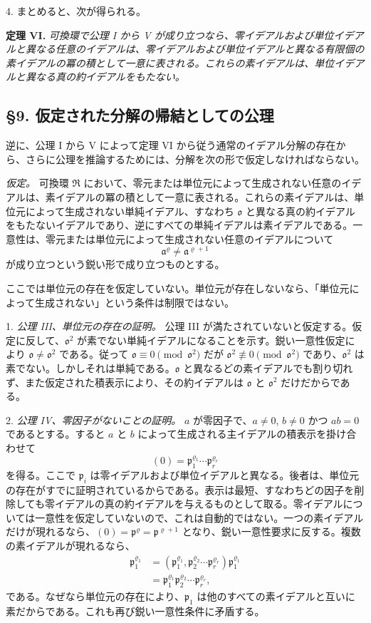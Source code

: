 \documentclass[11pt]{article}
\providecommand{\mR}{\mathfrak{R}}
\providecommand{\ma}{\mathfrak{a}}
\providecommand{\mo}{\mathfrak{o}}
\providecommand{\mpideal}{\mathfrak{p}}
\begin{document}
4. まとめると、次が得られる。

\textbf{定理 VI.} \emph{可換環で公理 I から V が成り立つなら、零イデアルおよび単位イデアルと異なる任意のイデアルは、零イデアルおよび単位イデアルと異なる有限個の素イデアルの冪の積として一意に表される。これらの素イデアルは、単位イデアルと異なる真の約イデアルをもたない。}

\subsection*{§9. 仮定された分解の帰結としての公理}

逆に、公理 I から V によって定理 VI から従う通常のイデアル分解の存在から、さらに公理を推論するためには、分解を次の形で仮定しなければならない。

\emph{仮定。} 可換環 $\mR$ において、零元または単位元によって生成されない任意のイデアルは、素イデアルの冪の積として一意に表される。これらの素イデアルは、単位元によって生成されない単純イデアル、すなわち $\mo$ と異なる真の約イデアルをもたないイデアルであり、逆にすべての単純イデアルは素イデアルである。一意性は、零元または単位元によって生成されない任意のイデアルについて
\[
        \ma^\varrho\ne\ma^{\varrho+1}
\]
が成り立つという鋭い形で成り立つものとする。

ここでは単位元の存在を仮定していない。単位元が存在しないなら、「単位元によって生成されない」という条件は制限ではない。

1. \emph{公理 III、単位元の存在の証明。} 公理 III が満たされていないと仮定する。仮定に反して、$\mo^2$ が素でない単純イデアルになることを示す。鋭い一意性仮定により $\mo\ne\mo^2$ である。従って $\mo\equiv0\pmod{\mo^2}$ だが $\mo^2\not\equiv0\pmod{\mo^2}$ であり、$\mo^2$ は素でない。しかしそれは単純である。$\mo$ と異なるどの素イデアルでも割り切れず、また仮定された積表示により、その約イデアルは $\mo$ と $\mo^2$ だけだからである。

2. \emph{公理 IV、零因子がないことの証明。} $a$ が零因子で、$a\ne0$, $b\ne0$ かつ $ab=0$ であるとする。すると $a$ と $b$ によって生成される主イデアルの積表示を掛け合わせて
\[
        (0)=\mpideal_1^{\varrho_1}\cdots\mpideal_r^{\varrho_r}
\]
を得る。ここで $\mpideal_i$ は零イデアルおよび単位イデアルと異なる。後者は、単位元の存在がすでに証明されているからである。表示は最短、すなわちどの因子を削除しても零イデアルの真の約イデアルを与えるものとして取る。零イデアルについては一意性を仮定していないので、これは自動的ではない。一つの素イデアルだけが現れるなら、$(0)=\mpideal^\varrho=\mpideal^{\varrho+1}$ となり、鋭い一意性要求に反する。複数の素イデアルが現れるなら、
\[
\begin{aligned}
\mpideal_1^{\varrho_1}
 &= (\mpideal_1^{\varrho_1},\mpideal_2^{\varrho_2}\cdots\mpideal_r^{\varrho_r})\mpideal_1^{\varrho_1}  \\
 &= \mpideal_1^{\varrho_1}\mpideal_2^{\varrho_2}\cdots\mpideal_r^{\varrho_r},
\end{aligned}
\]
である。なぜなら単位元の存在により、$\mpideal_1$ は他のすべての素イデアルと互いに素だからである。これも再び鋭い一意性条件に矛盾する。
\end{document}
